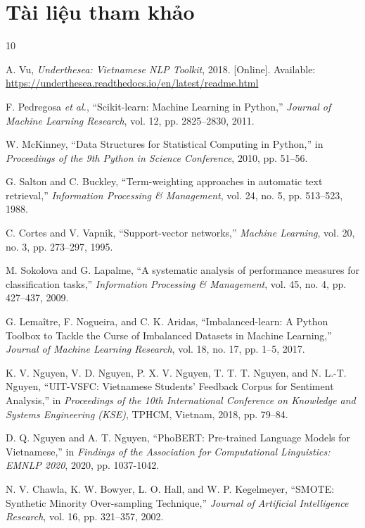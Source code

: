 \documentclass[conference,10pt,a4paper]{IEEEtran}
\begin{document}
\section{Tài liệu tham khảo}
\begin{thebibliography}{10}

A. Vu, \emph{Underthesea: Vietnamese NLP Toolkit}, 2018. [Online]. Available: \url{https://underthesea.readthedocs.io/en/latest/readme.html}

F. Pedregosa \emph{et al.}, ``Scikit-learn: Machine Learning in Python,'' \emph{Journal of Machine Learning Research}, vol. 12, pp. 2825–2830, 2011.

W. McKinney, ``Data Structures for Statistical Computing in Python,'' in \emph{Proceedings of the 9th Python in Science Conference}, 2010, pp. 51–56.

G. Salton and C. Buckley, ``Term-weighting approaches in automatic text retrieval,'' \emph{Information Processing \& Management}, vol. 24, no. 5, pp. 513–523, 1988.

C. Cortes and V. Vapnik, ``Support-vector networks,'' \emph{Machine Learning}, vol. 20, no. 3, pp. 273–297, 1995.

M. Sokolova and G. Lapalme, ``A systematic analysis of performance measures for classification tasks,'' \emph{Information Processing \& Management}, vol. 45, no. 4, pp. 427–437, 2009.

G. Lemaître, F. Nogueira, and C. K. Aridas, ``Imbalanced-learn: A Python Toolbox to Tackle the Curse of Imbalanced Datasets in Machine Learning,'' \emph{Journal of Machine Learning Research}, vol. 18, no. 17, pp. 1–5, 2017.

K. V. Nguyen, V. D. Nguyen, P. X. V. Nguyen, T. T. T. Nguyen, and N. L.-T. Nguyen, ``UIT-VSFC: Vietnamese Students' Feedback Corpus for Sentiment Analysis,'' in \emph{Proceedings of the 10th International Conference on Knowledge and Systems Engineering (KSE)}, TPHCM, Vietnam, 2018, pp. 79–84.

D. Q. Nguyen and A. T. Nguyen, ``PhoBERT: Pre-trained Language Models for Vietnamese,'' in \emph{Findings of the Association for Computational Linguistics: EMNLP 2020}, 2020, pp. 1037-1042.

N. V. Chawla, K. W. Bowyer, L. O. Hall, and W. P. Kegelmeyer, ``SMOTE: Synthetic Minority Over-sampling Technique,'' \emph{Journal of Artificial Intelligence Research}, vol. 16, pp. 321–357, 2002.

\end{thebibliography}
\end{document}
